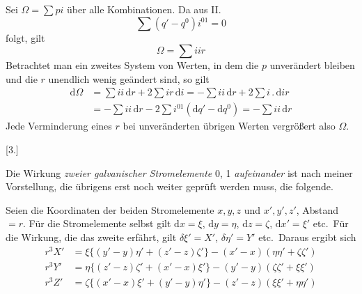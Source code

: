 Sei $\Omega=\sum pi$ über alle Kombinationen. Da aus II.
\[
\sum(q'-q^0)i^{01}=0
\]
folgt, gilt
\[
\Omega=\sum iir
\]
Betrachtet man ein zweites System von Werten, in dem die $p$ unverändert bleiben und die $r$ unendlich wenig geändert sind, so gilt
\[
\begin{aligned}
\mathrm d\Omega&=\sum ii\,\mathrm dr+2\sum ir\,\mathrm di=-\sum ii\,\mathrm dr+2\sum i\,.\,\mathrm dir\\
&=-\sum ii\,\mathrm dr-2\sum i^{01}(\mathrm dq'-\mathrm dq^0)=-\sum ii\,\mathrm dr
\end{aligned}
\]
Jede Verminderung eines $r$ bei unveränderten übrigen Werten vergrößert also $\Omega$.

\begin{center}[3.]\end{center}
Die Wirkung \textit{zweier galvanischer Stromelemente} 0, 1 \textit{aufeinander} ist nach meiner Vorstellung, die übrigens erst noch weiter geprüft werden muss, die folgende.

Seien die Koordinaten der beiden Stromelemente $x,y,z$ und $x',y',z'$, Abstand $=r$. Für die Stromelemente selbst gilt $\mathrm dx=\xi$, $\mathrm dy=\eta$, $\mathrm dz=\zeta$, $\mathrm dx'=\xi'$ etc.\ Für die Wirkung, die das zweite erfährt, gilt $\delta\xi'=X'$, $\delta\eta'=Y'$ etc.\ Daraus ergibt sich
\[
\begin{aligned}
r^3X'&=\xi\{(y'-y)\eta'+(z'-z)\zeta'\}-(x'-x)(\eta\eta'+\zeta\zeta')\\
r^3Y'&=\eta\{(z'-z)\zeta'+(x'-x)\xi'\}-(y'-y)(\zeta\zeta'+\xi\xi')\\
r^3Z'&=\zeta\{(x'-x)\xi'+(y'-y)\eta'\}-(z'-z)(\xi\xi'+\eta\eta')
\end{aligned}
\]

